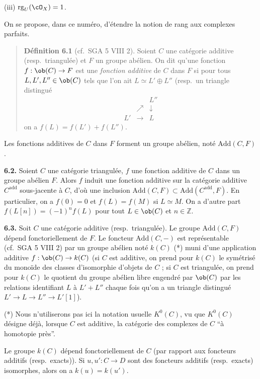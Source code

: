 (iii) $\mathrm{rg}_U(\cO_X) = 1$.

On se propose, dans ce numéro, d'étendre la notion de rang aux complexes parfaits.

\begin{quote}
\textbf{Définition 6.1} (cf.\ SGA 5 VIII 2). Soient $C$ une catégorie additive (resp.\ triangulée) et $F$ un groupe abélien. On dit qu'une fonction $f : \ob(C) \to F$ est une \emph{fonction additive} de $C$ dans $F$ si pour tous $L, L', L'' \in \ob(C)$ tels que l'on ait $L \simeq L' \oplus L''$ (resp.\ un triangle distingué
\[
\begin{array}{ccc}
& & L'' \\
& \nearrow & \downarrow \\
L' & \longrightarrow & L
\end{array}
\]
on a $f(L) = f(L') + f(L'')$.
\end{quote}

Les fonctions additives de $C$ dans $F$ forment un groupe abélien, noté $\mathrm{Add}(C, F)$.

\textbf{6.2.} Soient $C$ une catégorie triangulée, $f$ une fonction additive de $C$ dans un groupe abélien $F$. Alors $f$ induit une fonction additive sur la catégorie additive $C^{\mathrm{add}}$ sous-jacente à $C$, d'où une inclusion $\mathrm{Add}(C, F) \subset \mathrm{Add}(C^{\mathrm{add}}, F)$. En particulier, on a $f(0) = 0$ et $f(L) = f(M)$ si $L \simeq M$. On a d'autre part $f(L[n]) = (-1)^n f(L)$ pour tout $L \in \ob(C)$ et $n \in \mathbb{Z}$.

\textbf{6.3.} Soit $C$ une catégorie additive (resp.\ triangulée). Le groupe $\mathrm{Add}(C, F)$ dépend fonctoriellement de $F$. Le foncteur $\mathrm{Add}(C, -)$ est représentable (cf.\ SGA 5 VIII 2) par un groupe abélien noté $k(C)$ (*) muni d'une application additive $f : \ob(C) \to k(C)$ (si $C$ est additive, on prend pour $k(C)$ le symétrisé du monoïde des classes d'isomorphie d'objets de $C$ ; si $C$ est triangulée, on prend pour $k(C)$ le quotient du groupe abélien libre engendré par $\ob(C)$ par les relations identifiant $L$ à $L' + L''$ chaque fois qu'on a un triangle distingué $L' \to L \to L'' \to L'[1]$).

(*) Nous n'utiliserons pas ici la notation usuelle $K^0(C)$, vu que $K^0(C)$ désigne déjà, lorsque $C$ est additive, la catégorie des complexes de $C$ ``à homotopie près''.

Le groupe $k(C)$ dépend fonctoriellement de $C$ (par rapport aux foncteurs additifs (resp.\ exacts)). Si $u, u' : C \to D$ sont des foncteurs additifs (resp.\ exacts) isomorphes, alors on a $k(u) = k(u')$.

